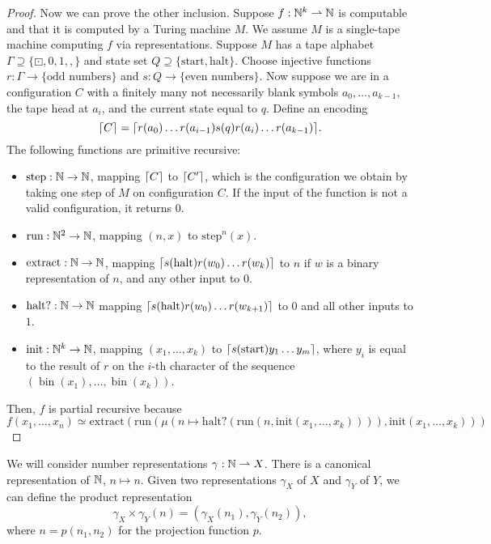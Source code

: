 \begin{proof}
  Now we can prove the other inclusion.
  Suppose $f: \mathbb{N}^k \rightharpoonup \mathbb{N}$ is computable and that it is computed by
  a Turing machine $M$.
  We assume $M$ is a single-tape machine computing $f$ via representations.
  Suppose $M$ has a tape alphabet $\Gamma \supseteq \{\boxdot, 0, 1,
  \mathtt{,}\}$ and state set $Q \supseteq \{\text{start}, \text{halt}\}$.
  Choose injective functions $r: \Gamma \to \{\text{odd numbers}\}$ and $s: Q
  \to \{\text{even numbers}\}$.
  Now suppose we are in a configuration $C$ with a finitely many not necessarily
  blank symbols $a_0, \ldots, a_{k-1}$, the tape head at $a_i$, and the current
  state equal to $q$.
  Define an encoding
  \[
	\lceil C \rceil = \lceil r(a_0) \ldots r(a_{i-1}) s(q) r(a_i) \ldots r(a_{k-1}) \rceil.
  \]
  The following functions are primitive recursive:
  \begin{itemize}
  \item $\text{step}: \mathbb{N} \to \mathbb{N}$, mapping $\lceil C \rceil$ to $\lceil C' \rceil$, which is
	the configuration we obtain by taking one step of $M$ on configuration $C$.
	If the input of the function is not a valid configuration, it returns $0$.
  \item $\text{run}: \mathbb{N}^2 \to \mathbb{N}$, mapping $(n,x)$ to $\text{step}^n(x)$.
  \item $\text{extract}: \mathbb{N} \to \mathbb{N}$, mapping $\lceil s(\text{halt}) r(w_0) \ldots
	  r(w_k) \rceil$ to $n$ if $w$ is a binary representation of $n$, and any other
	input to $0$.
  \item $\text{halt?}: \mathbb{N} \to \mathbb{N}$ mapping $\lceil s(\text{halt}) r(w_0) \ldots
	  r(w_{k+1}) \rceil$ to $0$ and all other inputs to $1$.
  \item $\text{init}: \mathbb{N}^k \to \mathbb{N}$, mapping $(x_1, \ldots, x_k)$ to
	$\lceil s(\text{start}) y_1 \ldots y_m \rceil$, where $y_i$ is equal to the result
	of $r$ on the $i$-th character of the sequence $(\operatorname{bin}(x_1),
	\ldots, \operatorname{bin}(x_k))$.
  \end{itemize}
  Then, $f$ is partial recursive because
  \[
	f(x_1, \ldots, x_n) \simeq \text{extract}(\text{run}(
	\mu(n \mapsto \text{halt?}(\text{run}(n, \text{init}(x_1, \ldots, x_k)))),
	\text{init}(x_1, \ldots, x_k)
	))
  \]
\end{proof}

We will consider number representations $\gamma: \mathbb{N} \rightharpoonup X$.
There is a canonical representation of $\mathbb{N}$, $n \mapsto n$.
Given two representations $\gamma_X$ of $X$ and $\gamma_Y$ of $Y$, we can define
the product representation
\[
  \gamma_X \times \gamma_Y (n) = (\gamma_X(n_1), \gamma_Y(n_2)),
\]
where $n = p(n_1, n_2)$ for the projection function $p$.

